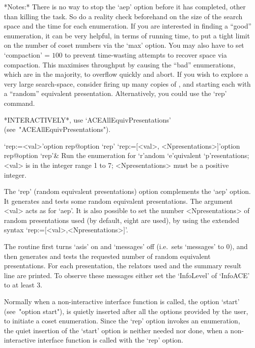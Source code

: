 *Notes:*
There is no way to stop the `aep'  option  before  it  has  completed,
other than killing the task. So do a reality check beforehand  on  the
size of the search space and the time for each enumeration. If you are
interested in finding a ``good'' enumeration, it can be very  helpful,
in terms of running time, to put a tight limit on the number of  coset
numbers via the `max' option. You may also have to set `compaction'  =
$100$  to  prevent  time-wasting  attempts  to   recover   space   via
compaction.  This  maximises  throughput  by   causing   the   ``bad''
enumerations, which are in  the  majority,  to  overflow  quickly  and
abort. If you wish to explore  a  very  large  search-space,  consider
firing up many copies of {\ACE}, and starting each with  a  ``random''
equivalent  presentation.  Alternatively,  you  could  use  the  `rep'
command.

*INTERACTIVELY*,            use             `ACEAllEquivPresentations'
(see~"ACEAllEquivPresentations").

\>`rep:=<val>'{option rep}@{option `rep'}
\>`rep:=[<val>, <Npresentations>]'{option rep}@{option `rep'}&
Run the enumeration for `r'andom `e'quivalent `p'resentations;
<val> is in the integer range 1 to 7;
<Npresentations> must be a positive integer.

The `rep' (random equivalent  presentations)  option  complements  the
`aep'  option.  It  generates  and  tests   some   random   equivalent
presentations. The argument <val>  acts  as  for  `aep'.  It  is  also
possible to set the number <Npresentations>  of  random  presentations
used (by default, eight  are  used),  by  using  the  extended  syntax
`rep:=[<val>,<Npresentations>]'.

The routine first  turns  `asis'  on  and  `messages'  off  (i.e.~sets
`messages' to 0), and then generates and tests the requested number of
random equivalent presentations. For each presentation,  the  relators
used and the  summary  result  line  are  printed.  To  observe  these
messages either set the `InfoLevel' of `InfoACE'  to  at  least  3.

Normally when a non-interactive {\ACE} interface function  is  called,
the option `start' (see~"option start"), is quietly inserted after all
the options provided by the user, to  initiate  a  coset  enumeration.
Since the `rep' option invokes an enumeration, the quiet insertion  of
the `start' option is neither needed nor done, when a  non-interactive
{\ACE} interface function is called with the `rep' option.


